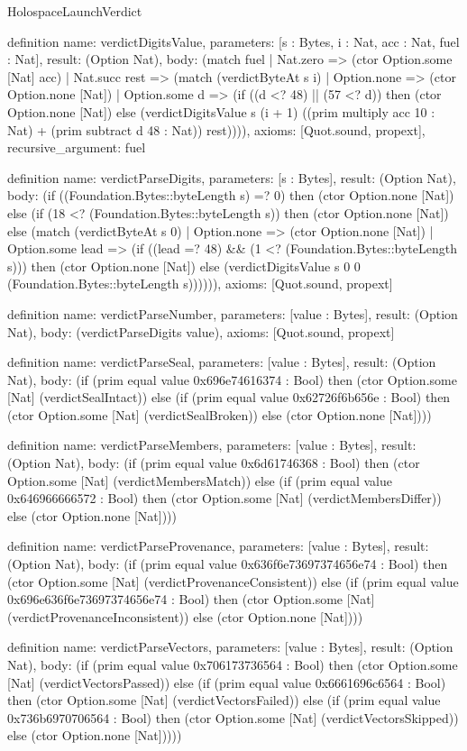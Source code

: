 \begin{lexlean}{HolospaceLaunchVerdict}
\begin{semanticmodule}
definition{
  name: verdictDigitsValue,
  parameters: [s : Bytes, i : Nat, acc : Nat, fuel : Nat],
  result: (Option Nat),
  body: (match fuel
    | Nat.zero => (ctor Option.some [Nat] acc)
    | Nat.succ rest => (match (verdictByteAt s i)
      | Option.none => (ctor Option.none [Nat])
      | Option.some d => (if ((d <? 48) || (57 <? d)) then (ctor Option.none [Nat]) else (verdictDigitsValue s (i + 1) ((prim multiply acc 10 : Nat) + (prim subtract d 48 : Nat)) rest)))),
  axioms: [Quot.sound, propext],
  recursive_argument: fuel
}

definition{
  name: verdictParseDigits,
  parameters: [s : Bytes],
  result: (Option Nat),
  body: (if ((Foundation.Bytes::byteLength s) =? 0) then (ctor Option.none [Nat]) else (if (18 <? (Foundation.Bytes::byteLength s)) then (ctor Option.none [Nat]) else (match (verdictByteAt s 0)
    | Option.none => (ctor Option.none [Nat])
    | Option.some lead => (if ((lead =? 48) && (1 <? (Foundation.Bytes::byteLength s))) then (ctor Option.none [Nat]) else (verdictDigitsValue s 0 0 (Foundation.Bytes::byteLength s)))))),
  axioms: [Quot.sound, propext]
}

definition{
  name: verdictParseNumber,
  parameters: [value : Bytes],
  result: (Option Nat),
  body: (verdictParseDigits value),
  axioms: [Quot.sound, propext]
}

definition{
  name: verdictParseSeal,
  parameters: [value : Bytes],
  result: (Option Nat),
  body: (if (prim equal value 0x696e74616374 : Bool) then (ctor Option.some [Nat] (verdictSealIntact)) else (if (prim equal value 0x62726f6b656e : Bool) then (ctor Option.some [Nat] (verdictSealBroken)) else (ctor Option.none [Nat])))
}

definition{
  name: verdictParseMembers,
  parameters: [value : Bytes],
  result: (Option Nat),
  body: (if (prim equal value 0x6d61746368 : Bool) then (ctor Option.some [Nat] (verdictMembersMatch)) else (if (prim equal value 0x646966666572 : Bool) then (ctor Option.some [Nat] (verdictMembersDiffer)) else (ctor Option.none [Nat])))
}

definition{
  name: verdictParseProvenance,
  parameters: [value : Bytes],
  result: (Option Nat),
  body: (if (prim equal value 0x636f6e73697374656e74 : Bool) then (ctor Option.some [Nat] (verdictProvenanceConsistent)) else (if (prim equal value 0x696e636f6e73697374656e74 : Bool) then (ctor Option.some [Nat] (verdictProvenanceInconsistent)) else (ctor Option.none [Nat])))
}

definition{
  name: verdictParseVectors,
  parameters: [value : Bytes],
  result: (Option Nat),
  body: (if (prim equal value 0x706173736564 : Bool) then (ctor Option.some [Nat] (verdictVectorsPassed)) else (if (prim equal value 0x6661696c6564 : Bool) then (ctor Option.some [Nat] (verdictVectorsFailed)) else (if (prim equal value 0x736b6970706564 : Bool) then (ctor Option.some [Nat] (verdictVectorsSkipped)) else (ctor Option.none [Nat]))))
}


\end{semanticmodule}
\end{lexlean}
